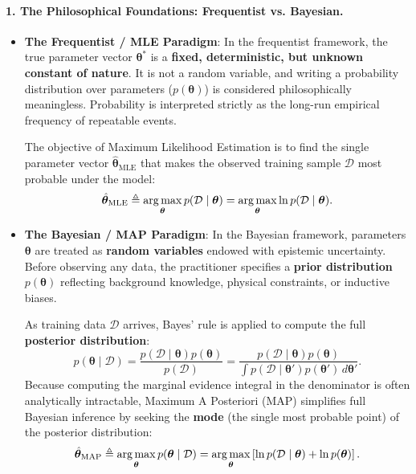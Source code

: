 \paragraph{1. The Philosophical Foundations: Frequentist vs. Bayesian.}
\begin{itemize}
  \item \textbf{The Frequentist / MLE Paradigm}: 
  In the frequentist framework, the true parameter vector $\boldsymbol{\theta}^*$ is a \textbf{fixed, deterministic, but unknown constant of nature}. It is not a random variable, and writing a probability distribution over parameters ($p(\boldsymbol{\theta})$) is considered philosophically meaningless. Probability is interpreted strictly as the long-run empirical frequency of repeatable events. 
  
  The objective of Maximum Likelihood Estimation is to find the single parameter vector $\hat{\boldsymbol{\theta}}_{\text{MLE}}$ that makes the observed training sample $\mathcal{D}$ most probable under the model:
  \begin{equation}
  \hat{\boldsymbol{\theta}}_{\text{MLE}} \triangleq \operatorname*{arg\,max}_{\boldsymbol{\theta}} p(\mathcal{D} \mid \boldsymbol{\theta}) = \operatorname*{arg\,max}_{\boldsymbol{\theta}} \ln p(\mathcal{D} \mid \boldsymbol{\theta}).
  \label{eq:mle_fundamental_def}
  \end{equation}
  
  \item \textbf{The Bayesian / MAP Paradigm}:
  In the Bayesian framework, parameters $\boldsymbol{\theta}$ are treated as \textbf{random variables} endowed with epistemic uncertainty. Before observing any data, the practitioner specifies a \textbf{prior distribution} $p(\boldsymbol{\theta})$ reflecting background knowledge, physical constraints, or inductive biases. 
  
  As training data $\mathcal{D}$ arrives, Bayes' rule is applied to compute the full \textbf{posterior distribution}:
  \begin{equation}
  p(\boldsymbol{\theta} \mid \mathcal{D}) = \frac{p(\mathcal{D} \mid \boldsymbol{\theta}) p(\boldsymbol{\theta})}{p(\mathcal{D})} = \frac{p(\mathcal{D} \mid \boldsymbol{\theta}) p(\boldsymbol{\theta})}{\int p(\mathcal{D} \mid \boldsymbol{\theta}') p(\boldsymbol{\theta}') \, d\boldsymbol{\theta}'}.
  \label{eq:bayesian_posterior_formula}
  \end{equation}
  Because computing the marginal evidence integral in the denominator is often analytically intractable, Maximum A Posteriori (MAP) simplifies full Bayesian inference by seeking the \textbf{mode} (the single most probable point) of the posterior distribution:
  \begin{equation}
  \hat{\boldsymbol{\theta}}_{\text{MAP}} \triangleq \operatorname*{arg\,max}_{\boldsymbol{\theta}} p(\boldsymbol{\theta} \mid \mathcal{D}) = \operatorname*{arg\,max}_{\boldsymbol{\theta}} \left[ \ln p(\mathcal{D} \mid \boldsymbol{\theta}) + \ln p(\boldsymbol{\theta}) \right].
  \label{eq:map_fundamental_def}
  \end{equation}
\end{itemize}

